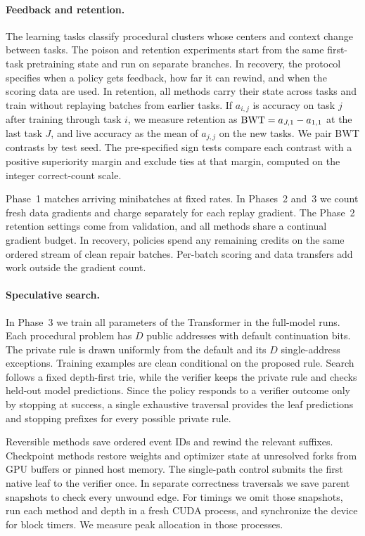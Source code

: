 \paragraph{Feedback and retention.}
The learning tasks classify procedural clusters whose centers and
context change between tasks. The poison and retention experiments
start from the same first-task pretraining state and run on separate
branches. In recovery, the protocol specifies when a policy gets
feedback, how far it can rewind, and when the scoring data are used.
In retention, all methods carry their state across tasks and train
without replaying batches from earlier tasks. If \(a_{i,j}\) is accuracy
on task \(j\) after training through task \(i\), we measure retention
as \(\mathrm{BWT}=a_{J,1}-a_{1,1}\) at the last task \(J\), and live accuracy
as the mean of \(a_{j,j}\) on the new tasks. We pair BWT contrasts
by test seed. The pre-specified sign tests compare each contrast with a
positive superiority margin and exclude ties at that margin, computed
on the integer correct-count scale.

Phase~1 matches arriving minibatches at fixed rates. In Phases~2
and~3 we count fresh data gradients and charge separately for each replay
gradient. The Phase~2 retention settings come from validation, and all
methods share a continual gradient budget. In recovery, policies spend
any remaining credits on the same ordered stream of clean repair
batches. Per-batch scoring and data transfers add work outside the
gradient count.

\paragraph{Speculative search.}
In Phase~3 we train all \PthreeParams{} parameters of the Transformer
in the full-model runs. Each procedural problem has \(D\) public
addresses with default continuation bits. The private rule is drawn
uniformly from the default and its \(D\) single-address exceptions.
Training examples are clean conditional on the proposed rule. Search
follows a fixed depth-first trie, while the verifier keeps the private
rule and checks held-out model predictions. Since the policy responds
to a verifier outcome only by stopping at success, a single exhaustive
traversal provides the leaf predictions and stopping prefixes for every
possible private rule.

Reversible methods save ordered event IDs and rewind the relevant
suffixes. Checkpoint methods restore weights and optimizer state at
unresolved forks from GPU buffers or pinned host memory. The single-path
control submits the first native leaf to the verifier once. In separate
correctness traversals we save parent snapshots to check every unwound
edge. For timings we omit those snapshots, run each method and depth in
a fresh CUDA process, and synchronize the device for block timers. We
measure peak allocation in those processes.
